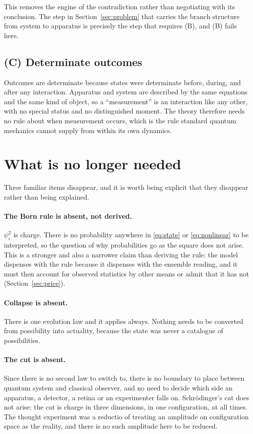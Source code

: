\documentclass[11pt]{article}
\begin{document}
This removes the engine of the contradiction rather than negotiating with its conclusion. The step
in Section~\ref{sec:problem} that carries the branch structure from system to apparatus is
precisely the step that requires (B), and (B) fails here.

\subsection*{(C) Determinate outcomes}

Outcomes are determinate because states were determinate before, during, and after any
interaction. Apparatus and system are described by the same equations and the same kind of object,
so a ``measurement'' is an interaction like any other, with no special status and no distinguished
moment. The theory therefore needs no rule about when measurement occurs, which is the rule
standard quantum mechanics cannot supply from within its own dynamics.

\section{What is no longer needed}\label{sec:gone}

Three familiar items disappear, and it is worth being explicit that they disappear rather than
being explained.

\paragraph{The Born rule is absent, not derived.} $\psi_i^2$ is charge. There is no probability
anywhere in \eqref{eq:state} or \eqref{eq:nonlinear} to be interpreted, so the question of why
probabilities go as the square does not arise. This is a stronger and also a narrower claim than
deriving the rule: the model dispenses with the rule because it dispenses with the ensemble reading,
and it must then account for observed statistics by other means or admit that it has not
(Section~\ref{sec:price}).

\paragraph{Collapse is absent.} There is one evolution law and it applies always. Nothing needs to
be converted from possibility into actuality, because the state was never a catalogue of
possibilities.

\paragraph{The cut is absent.} Since there is no second law to switch to, there is no boundary to
place between quantum system and classical observer, and no need to decide which side an apparatus,
a detector, a retina or an experimenter falls on. Schr\"odinger's cat does not arise: the cat is
charge in three dimensions, in one configuration, at all times. The thought experiment was a
reductio of treating an amplitude on configuration space as the reality, and there is no such
amplitude here to be reduced.
\end{document}
